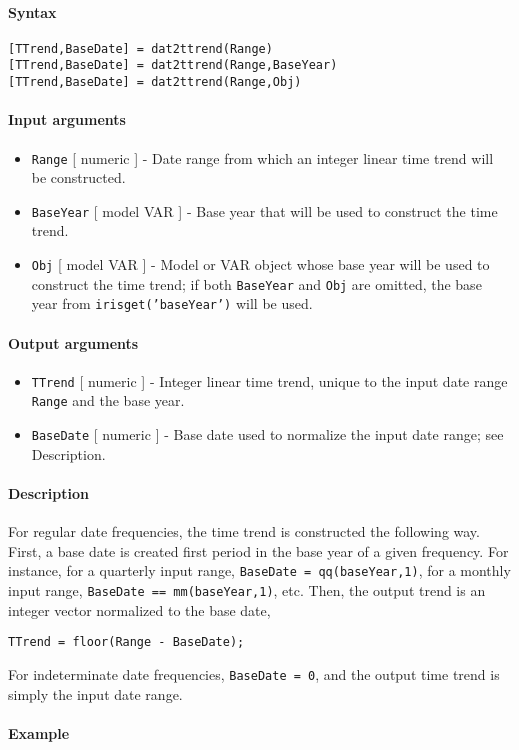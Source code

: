


	\paragraph{Syntax}

\begin{verbatim}
[TTrend,BaseDate] = dat2ttrend(Range)
[TTrend,BaseDate] = dat2ttrend(Range,BaseYear)
[TTrend,BaseDate] = dat2ttrend(Range,Obj)
\end{verbatim}

\paragraph{Input arguments}

\begin{itemize}
\item
  \texttt{Range} {[} numeric {]} - Date range from which an integer
  linear time trend will be constructed.
\item
  \texttt{BaseYear} {[} model \textbar{} VAR {]} - Base year that will
  be used to construct the time trend.
\item
  \texttt{Obj} {[} model \textbar{} VAR {]} - Model or VAR object whose
  base year will be used to construct the time trend; if both
  \texttt{BaseYear} and \texttt{Obj} are omitted, the base year from
  \texttt{irisget('baseYear')} will be used.
\end{itemize}

\paragraph{Output arguments}

\begin{itemize}
\item
  \texttt{TTrend} {[} numeric {]} - Integer linear time trend, unique to
  the input date range \texttt{Range} and the base year.
\item
  \texttt{BaseDate} {[} numeric {]} - Base date used to normalize the
  input date range; see Description.
\end{itemize}

\paragraph{Description}

For regular date frequencies, the time trend is constructed the
following way. First, a base date is created first period in the base
year of a given frequency. For instance, for a quarterly input range,
\texttt{BaseDate = qq(baseYear,1)}, for a monthly input range,
\texttt{BaseDate == mm(baseYear,1)}, etc. Then, the output trend is an
integer vector normalized to the base date,

\begin{verbatim}
TTrend = floor(Range - BaseDate);
\end{verbatim}

For indeterminate date frequencies, \texttt{BaseDate = 0}, and the
output time trend is simply the input date range.

\paragraph{Example}


